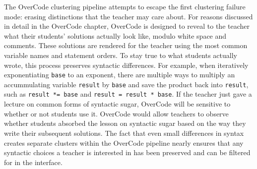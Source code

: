 \documentclass[12pt,twoside]{mitthesis}
\providecommand{\DIFdelbegin}{} %
\providecommand{\DIFdelend}{} %
\begin{document}
{{{{{{{{{{The OverCode clustering pipeline attempts to escape the first clustering failure mode: erasing distinctions that the teacher may care about. For reasons discussed in detail in the OverCode chapter, OverCode is designed to reveal to the teacher what their students' solutions actually look like, modulo white space and comments. These solutions are rendered for the teacher using the most common variable names and statement orders. \DIFdelbegin %
\DIFdelend To stay true to what students actually wrote, this process preserves syntactic differences. For example, when iteratively exponentiating \texttt{base} to an exponent, there are multiple ways to multiply an accummulating variable \texttt{result} by \texttt{base} and save the product back into \texttt{result}, such as \texttt{result *= base} and \texttt{result = result * base}. If the teacher just gave a lecture on common forms of syntactic sugar, OverCode will be sensitive to whether or not students use it. OverCode would allow teachers to observe whether students absorbed the lesson on syntactic sugar based on the way they write their subsequent solutions. The fact that even small differences in syntax creates separate clusters within the OverCode pipeline nearly ensures that any syntactic choices a teacher is interested in has been preserved and can be filtered for in the interface.



}}}}}}}}}}
\end{document}
